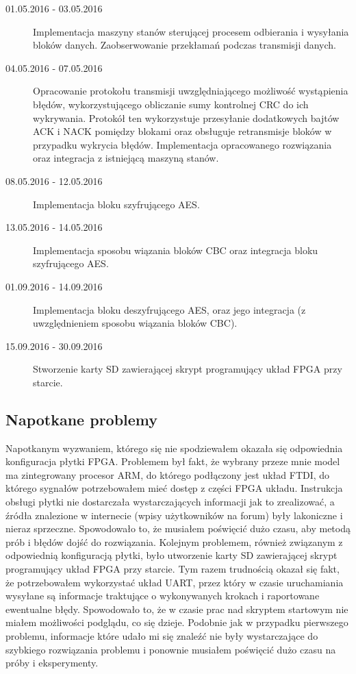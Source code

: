 \begin{description}
\item[01.05.2016 - 03.05.2016] Implementacja maszyny stanów sterującej procesem odbierania i wysyłania bloków danych. Zaobserwowanie przekłamań podczas transmisji danych.

\item[04.05.2016 - 07.05.2016] Opracowanie protokołu transmisji uwzględniającego możliwość wystąpienia błędów, wykorzystującego obliczanie sumy kontrolnej CRC do ich wykrywania. Protokół ten wykorzystuje przesyłanie dodatkowych bajtów ACK i NACK pomiędzy blokami oraz obsługuje retransmisje bloków w przypadku wykrycia błędów. Implementacja opracowanego rozwiązania oraz integracja z istniejącą maszyną stanów.

\item[08.05.2016 - 12.05.2016] Implementacja bloku szyfrującego AES.

\item[13.05.2016 - 14.05.2016] Implementacja sposobu wiązania bloków CBC oraz integracja bloku szyfrującego AES.

\item[01.09.2016 - 14.09.2016] Implementacja bloku deszyfrującego AES, oraz jego integracja (z uwzględnieniem sposobu wiązania bloków CBC).

\item[15.09.2016 - 30.09.2016] Stworzenie karty SD zawierającej skrypt programujący układ FPGA przy starcie.
\end{description}


\subsection{Napotkane problemy}
Napotkanym wyzwaniem, którego się nie spodziewałem okazała się odpowiednia konfiguracja płytki FPGA. Problemem był fakt, że wybrany przeze mnie model ma zintegrowany procesor ARM, do którego podłączony jest układ FTDI, do którego sygnałów potrzebowałem mieć dostęp z części FPGA układu. Instrukcja obsługi płytki nie dostarczała wystarczających informacji jak to zrealizować, a źródła znalezione w internecie (wpisy użytkowników na forum) były lakoniczne i nieraz sprzeczne. Spowodowało to, że musiałem poświęcić dużo czasu, aby metodą prób i błędów dojść do rozwiązania.
\newline
Kolejnym problemem, również związanym z odpowiednią konfiguracją płytki, było utworzenie karty SD zawierającej skrypt programujący układ FPGA przy starcie. Tym razem trudnością okazał się fakt, że potrzebowałem wykorzystać układ UART, przez który w czasie uruchamiania wysyłane są informacje traktujące o wykonywanych krokach i raportowane ewentualne błędy. Spowodowało to, że w czasie prac nad skryptem startowym nie miałem możliwości podglądu, co się dzieje. Podobnie jak w przypadku pierwszego problemu, informacje które udało mi się znaleźć nie były wystarczające do szybkiego rozwiązania problemu i ponownie musiałem poświęcić dużo czasu na próby i eksperymenty.

\newpage